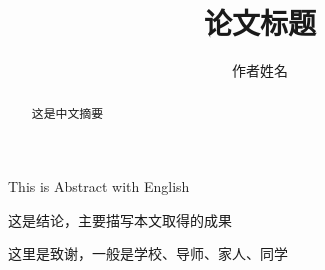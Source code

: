 \documentclass[a4paper]{hnuthesis}
\title{论文标题}
\author{作者姓名}
\institute{学院名称}
\begin{document}
\maketitle

\frontmatter

\pagestyle{plain}

\makepaperdeclare

\begin{abstract}
  这是中文摘要

\end{abstract}

\begin{engabstract}

  This is Abstract with English
  
\end{engabstract}

\tableofcontents
{}

\mainmatter










\begin{conclusion}
  这是结论，主要描写本文取得的成果
\end{conclusion}




\begin{acknowledge}
  这里是致谢，一般是学校、导师、家人、同学
\end{acknowledge}
\end{document}
